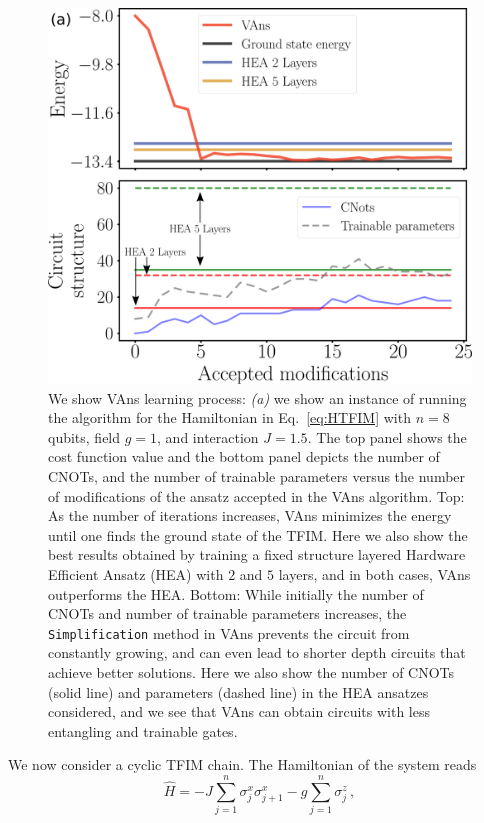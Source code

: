 \begin{figure}[t!]
\centering
\includegraphics[width=.9\textwidth]{Figures/VANS/Fig7.pdf}
\caption{We show VAns learning process: \textit{(a)} we show an instance of running the algorithm for the Hamiltonian in Eq.~\eqref{eq:HTFIM} with $n=8$ qubits, field $g=1$, and interaction $J=1.5$. The top panel shows the cost function value and the bottom panel depicts the number of CNOTs, and the number of trainable parameters versus the number of modifications of the ansatz accepted in the VAns algorithm. Top: As the number of iterations increases, VAns minimizes the energy until one finds the ground state of the TFIM. Here we also show the best results obtained by training a fixed structure layered Hardware Efficient Ansatz (HEA) with $2$ and $5$ layers, and in both cases, VAns outperforms the HEA. Bottom: While initially the number of CNOTs and number of trainable parameters increases, the \texttt{Simplification} method in VAns prevents the circuit from constantly growing, and can even lead to shorter depth circuits that achieve better solutions. Here we also show the number of CNOTs (solid line) and parameters (dashed line) in the HEA ansatzes considered, and we see that VAns can obtain circuits with less entangling and trainable gates. }
\label{fig:learning}
\end{figure}
We now consider a cyclic TFIM chain. The Hamiltonian of the system reads
\begin{equation}\label{eq:HTFIM}
    \hat{H}=-J\sum_{j=1}^n \sigma_j^x\sigma_{j+1}^x-g\sum_{j=1}^n \sigma_j^z\,,
\end{equation}
